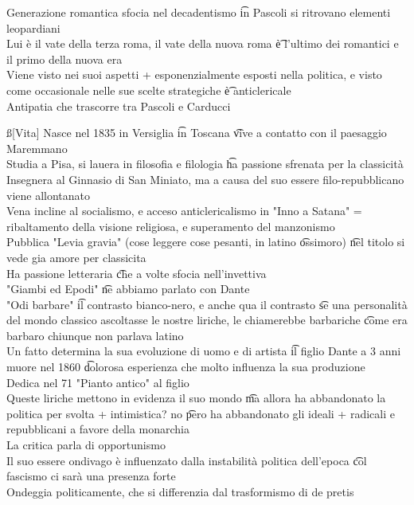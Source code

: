 \documentclass[12pt]{article}
\begin{document}
\s[Carducci]
Generazione romantica sfocia nel decadentismo \t in Pascoli si ritrovano elementi leopardiani \\
Lui è il vate della terza roma, il vate della nuova roma \t è l'ultimo dei romantici e il primo della nuova era \\
Viene visto nei suoi aspetti + esponenzialmente esposti nella politica, e visto come occasionale nelle sue scelte strategiche \t è anticlericale \\
Antipatia che trascorre tra Pascoli e Carducci

\ss[Vita]
Nasce nel 1835 in Versiglia \t in Toscana \t vive a contatto con il paesaggio Maremmano \\
Studia a Pisa, si lauera in filosofia e filologia \t ha passione sfrenata per la classicità \\
Insegnera al Ginnasio di San Miniato, ma a causa del suo essere filo-repubblicano viene allontanato \\
Vena incline al socialismo, e acceso anticlericalismo in "Inno a Satana" = ribaltamento della visione religiosa, e superamento del manzonismo \\
Pubblica "Levia gravia" (cose leggere cose pesanti, in latino \t ossimoro) \t nel titolo si vede gia amore per classicita \\
Ha passione letteraria \t che a volte sfocia nell'invettiva \\
"Giambi ed Epodi" \t ne abbiamo parlato con Dante \\
"Odi barbare" \t il contrasto bianco-nero, e anche qua il contrasto \t se una personalità del mondo classico ascoltasse le nostre liriche, le chiamerebbe barbariche \t come era barbaro chiunque non parlava latino \\
Un fatto determina la sua evoluzione di uomo e di artista \t il figlio Dante a 3 anni muore nel 1860 \t dolorosa esperienza che molto influenza la sua produzione \\
Dedica nel 71 "Pianto antico" al figlio \\
Queste liriche mettono in evidenza il suo mondo \t ma allora ha abbandonato la politica per svolta + intimistica? no \t pero ha abbandonato gli ideali + radicali e repubblicani a favore della monarchia \\
La critica parla di opportunismo \\
Il suo essere ondivago è influenzato dalla instabilità politica dell'epoca \t col fascismo ci sarà una presenza forte \\
Ondeggia politicamente, che si differenzia dal trasformismo di de pretis
\end{document}
